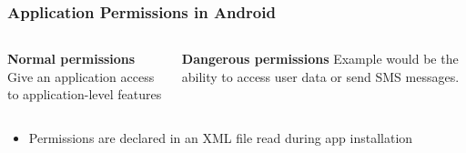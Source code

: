 \documentclass{beamer}
\begin{document}
		\begin{frame}
		\frametitle{Application Permissions in Android}
\begin{center}

			\begin{columns}[t]
			\begin{column}[T]{5cm}
			 \textbf{Normal permissions}
			 \\Give an application access to application-level features 
			\end{column}
			\begin{column}[T]{5cm}
			\textbf{Dangerous permissions}
			Example would be the ability to access user data or send SMS messages.
			\end{column}
				
			\end{columns}
						\begin{itemize}
			\item Permissions are declared in an XML file read during app installation
			\end{itemize}
			\end{center}
		\end{frame}
		
\end{document}
